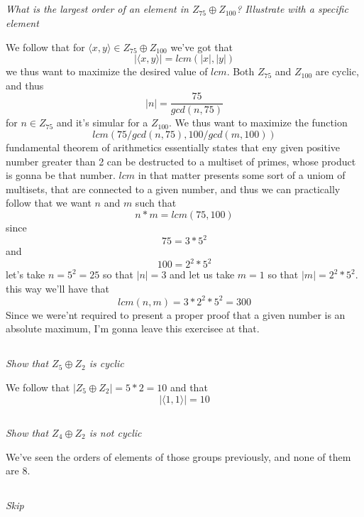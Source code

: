 \documentclass[11pt,oneside,titlepage]{book}
\newcommand{\eangle}[1]{\langle #1 \rangle}
\begin{document}
\subsection{}

\textit{What is the largest order of an element in $Z_{75} \oplus Z_{100}$? Illustrate with a
  specific element}

We follow that for $\eangle{x, y} \in Z_{75} \oplus Z_{100}$ we've got that 
$$|\eangle{x, y}| = lcm(|x|, |y|)$$
we thus want to maximize the desired value of $lcm$. Both $Z_{75}$ and $Z_{100}$ are
cyclic, and thus
$$|n| = \frac{75}{gcd(n, 75)}$$
for $n \in Z_{75}$ and it's simular for a $Z_{100}$. We thus want to maximize the function
$$lcm(75/gcd(n, 75), 100/gcd(m, 100))$$
fundamental theorem of arithmetics essentially states that eny given positive number greater than
2 can be destructed to a multiset of primes, whose product is gonna be that number. $lcm$ in
that matter presents some sort of a uniom of multisets, that are connected to a given number,
and thus we can practically follow that we want $n$ and $m$ such that
$$n * m = lcm(75, 100)$$
since
$$75 = 3 * 5^2$$
and
$$100 = 2^2 * 5^2$$
let's take $n = 5^2 = 25$ so that $|n| = 3$ and let us take $m = 1$ so that $|m| = 2^2 * 5^2$.
this way we'll have that
$$lcm(n, m) = 3 * 2^2 * 5^2 = 300$$
Since we were'nt required to present a proper proof that a given number is an absolute maximum,
I'm gonna leave this exercisee at that.

\subsection{}

\textit{Show that $Z_5 \oplus Z_2$ is cyclic}

We follow that $|Z_5 \oplus Z_2| = 5 * 2 = 10$ and that
$$|\eangle{1, 1}| = 10$$

\subsection{}

\textit{Show that $Z_4 \oplus Z_2$ is not cyclic}

We've seen the orders of elements of those groups previously, and none of them are $8$.

\subsection{}

\textit{Skip}
\end{document}
